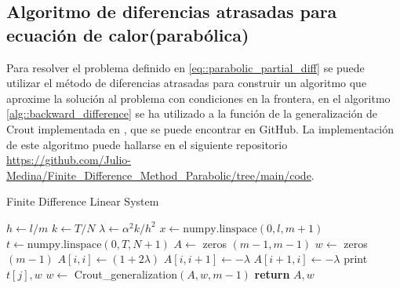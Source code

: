 \documentclass[a4paper]{article}
\begin{document}
\subsection{Algoritmo de diferencias atrasadas para ecuación de calor(parabólica)}
Para resolver el problema definido en \ref{eq::parabolic_partial_diff} se puede utilizar el método de diferencias atrasadas para construir un algoritmo que aproxime la solución al problema con condiciones en la frontera, en el algoritmo \ref{alg::backward_difference} se ha utilizado a la función de la generalización de Crout implementada en \cite{Medina}, que se puede encontrar en GitHub. La implementación de este algoritmo puede hallarse en el siguiente repositorio 
\url{https://github.com/Julio-Medina/Finite_Difference_Method_Parabolic/tree/main/code}.
\begin{algorithm}[H]
\caption{Finite Difference Linear System}\label{alg::backward_difference}
\begin{algorithmic}[H]
\State $h \gets l/m$
\State $k \gets T/N$
\State $\lambda \gets \alpha^2 k /h^2$
\State $x\gets \text{numpy.linspace}(0, l, m+1)$
\State $t \gets \text{numpy.linspace}(0, T, N+1)$
\State $A \gets$ zeros $(m-1,m-1)$
\State $w \gets$ zeros $(m-1)$
\State $A[i,i]\gets (1+2\lambda)$
\State $A[i,i+1]\gets-\lambda$
\State $A[i+1,i]\gets-\lambda$
\EndIf
\EndFor
{}
\State print $t[j],w$
\State $w \gets$ Crout\_generalization$(A,w,m-1)$
\EndFor
\State \textbf{return} $A, w$
\EndFunction
\end{algorithmic}
\end{algorithm}
\end{document}
